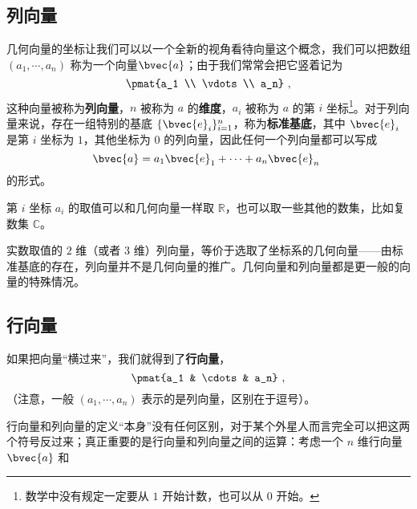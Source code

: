 
\begin{issues}
\issueDraft
\issueMissDepend
\end{issues}

\subsection{列向量}

几何向量的坐标让我们可以以一个全新的视角看待向量这个概念，我们可以把数组 $(a_1, \cdots, a_n)$ 称为一个向量$\bvec{a}$；由于我们常常会把它竖着记为
\begin{equation}
\pmat{a_1 \\ \vdots \\ a_n}~,
\end{equation}
这种向量被称为\textbf{列向量}，$n$ 被称为 $a$ 的\textbf{维度}，$a_i$ 被称为 $a$ 的第 $i$ 坐标\footnote{数学中没有规定一定要从 $1$ 开始计数，也可以从 $0$ 开始。}。对于列向量来说，存在一组特别的基底 $\{\bvec{e}_i\}_{i = 1}^n$，称为\textbf{标准基底}，其中 $\bvec{e}_i$ 是第 $i$ 坐标为 $1$，其他坐标为 $0$ 的列向量，因此任何一个列向量都可以写成
\begin{equation}
\bvec{a} = a_1 \bvec{e}_1 + \cdots + a_n \bvec{e}_n~
\end{equation}
的形式。

第 $i$ 坐标 $a_i$ 的取值可以和几何向量一样取 $\mathbb{R}$，也可以取一些其他的数集，比如复数集 $\mathbb{C}$。


实数取值的 $2$ 维（或者 $3$ 维）列向量，等价于选取了坐标系的几何向量——由标准基底的存在，列向量并不是几何向量的推广。几何向量和列向量都是更一般的向量的特殊情况。

\subsection{行向量}

如果把向量“横过来”，我们就得到了\textbf{行向量}，
\begin{equation}
\pmat{a_1 & \cdots & a_n}~,
\end{equation}
（注意，一般 $(a_1, \cdots, a_n)$ 表示的是列向量，区别在于逗号）。

行向量和列向量的定义“本身”没有任何区别，对于某个外星人而言完全可以把这两个符号反过来；真正重要的是行向量和列向量之间的运算：考虑一个 $n$ 维行向量 $\bvec{a}$ 和